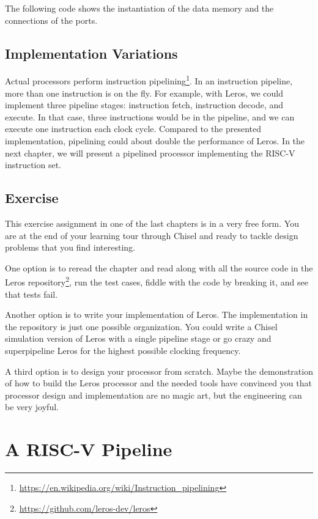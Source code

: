 \documentclass[%
    10pt,
    headinclude, footexclude,
    openright, %
    notitlepage,
    cleardoubleempty,
    headsepline,
    pointlessnumbers,
    bibtotoc, idxtotoc,
    ]{scrbook}
\newcommand{\myref}[2]{\href{#1}{#2}}
\renewcommand{\myref}[2]{{#2}{\footnote{\url{#1}}}}
\begin{document}

The following code shows the instantiation of the data memory and the connections
of the ports. 



\section{Implementation Variations}

Actual processors perform
\myref{https://en.wikipedia.org/wiki/Instruction_pipelining}{instruction pipelining}.
In an instruction pipeline, more than one instruction is on the fly. For example,
with Leros, we could implement three pipeline stages: instruction fetch,
instruction decode, and execute. In that case, three instructions would
be in the pipeline, and we can execute one instruction each clock cycle.
Compared to the presented implementation, pipelining could about double
the performance of Leros.
In the next chapter, we will present a pipelined processor implementing the
RISC-V instruction set.

\section{Exercise}

This exercise assignment in one of the last chapters is in a very free form. You are at the end
of your learning tour through Chisel and ready to tackle design problems that
you find interesting.

One option is to reread the chapter and read along with all the source code in the
\myref{https://github.com/leros-dev/leros}{Leros repository}, run the test cases,
fiddle with the code by breaking it, and see that tests fail.

Another option is to write your implementation of Leros.
The implementation in the repository is just one possible organization.
You could write a Chisel simulation version of Leros with a single pipeline stage
or go crazy and superpipeline Leros for the highest possible clocking frequency.

A third option is to design your processor from scratch. Maybe the demonstration of
how to build the Leros processor and the needed tools have convinced you that processor
design and implementation are no magic art, but the engineering can be very joyful.

\chapter{A RISC-V Pipeline}
\end{document}
